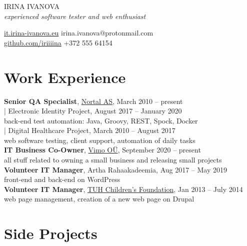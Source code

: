\documentclass[a4paper, 12pt]{article}
\begin{document}
\begin{center}
  {\LARGE{IRINA IVANOVA}}\\
  \textit{experienced software tester and web enthusiast}
\end{center}
\href{https://it.irina-ivanova.eu}{it.irina-ivanova.eu}
\hspace{4.6cm}
irina.ivanova@protonmail.com\\
\href{https://github.com/iriiiina}{github.com/iriiiina}
\hspace{4.4cm}
+372 555 64154

\section{Work Experience}

\textbf{Senior QA Specialist}, \href{https://nortal.com}{Nortal AS}, March 2010 \--- present\\
\indent | Electronic Identity Project, August 2017 \--- January 2020\\
\indent \indent \indent back-end test automation: Java, Groovy, REST, Spock, Docker\\
\indent | Digital Healthcare Project, March 2010 \--- August 2017\\
\indent \indent \indent web software testing, client support, automation of daily tasks\\
\textbf{IT Business Co-Owner}, \href{https://vimo.ee/}{Vimo OÜ}, September 2020 \--- present\\
\indent \indent \indent all stuff related to owning a small business and releasing small projects\\
\textbf{Volunteer IT Manager}, Artha Rahaakadeemia, Aug 2017 \--- May 2019\\
\indent \indent \indent front-end and back-end on WordPress\\
\textbf{Volunteer IT Manager}, \href{https://www.lastefond.ee}{TUH Children's Foundation}, Jan 2013 \--- July 2014\\
\indent \indent \indent web page management, creation of a new web page on Drupal

\section{Side Projects}
\end{document}
